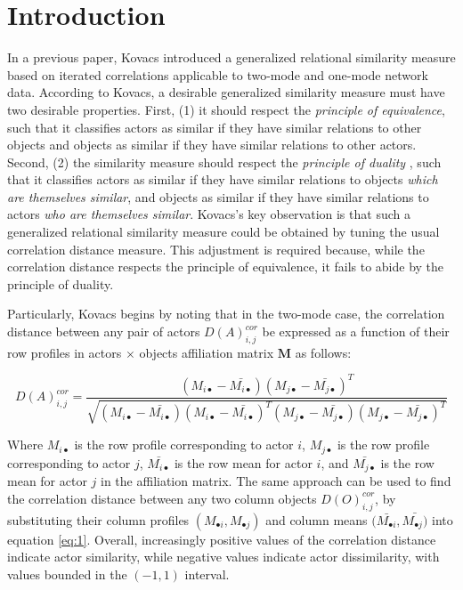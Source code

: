\documentclass[a4paper,fleqn]{cas-sc}
\begin{document}
\section{Introduction}
In a previous paper, Kovacs \citeyearpar{kovacs2010} introduced a generalized relational similarity measure based on iterated correlations applicable to two-mode and one-mode network data. According to Kovacs, a desirable generalized similarity measure must have two desirable properties. First, (1) it should respect the \textit{principle of equivalence}, such that it classifies actors as similar if they have similar relations to other objects and objects as similar if they have similar relations to other actors. Second, (2) the similarity measure should respect the \textit{principle of duality} \citep{breiger1974}, such that it classifies actors as similar if they have similar relations to objects \textit{which are themselves similar}, and objects as similar if they have similar relations to actors \textit{who are themselves similar}. Kovacs's key observation is that such a generalized relational similarity measure could be obtained by tuning the usual correlation distance measure. This adjustment is required because, while the correlation distance respects the principle of equivalence, it fails to abide by the principle of duality. 

Particularly, Kovacs begins by noting that in the two-mode case, the correlation distance between any pair of actors $D(A)^{cor}_{i,j}$ be expressed as a function of their row profiles in actors $\times$ objects affiliation matrix $\mathbf{M}$ as follows:

\begin{equation}
    D(A)^{cor}_{i,j} = 
    \frac{
    (M_{i\bullet} - \bar{M_{i\bullet}})
    (M_{j\bullet} - \bar{M_{j\bullet}})^T
    }
    {
    \sqrt{
    (M_{i\bullet} - \bar{M_{i\bullet}})
    (M_{i\bullet} - \bar{M_{i\bullet}})^T
    (M_{j\bullet} - \bar{M_{j\bullet}})
    (M_{j\bullet} - \bar{M_{j\bullet}})^T
        }
    }
    \label{eq:1}
\end{equation}

Where $M_{i\bullet}$ is the row profile corresponding to actor $i$, $M_{j\bullet}$ is the row profile corresponding to actor $j$, $\bar{M_{i\bullet}}$ is the row mean for actor $i$, and $\bar{M_{j\bullet}}$ is the row mean for actor $j$ in the affiliation matrix. The same approach can be used to find the correlation distance between any two column objects $D(O)^{cor}_{i, j}$, by substituting their column profiles $(M_{\bullet i}, M_{\bullet j})$ and column means $(\bar{M_{\bullet i}}, \bar{M_{\bullet j})}$ into equation \ref{eq:1}. Overall, increasingly positive values of the correlation distance indicate actor similarity, while negative values  indicate actor dissimilarity, with values bounded in the $(-1, 1)$ interval.
\end{document}
